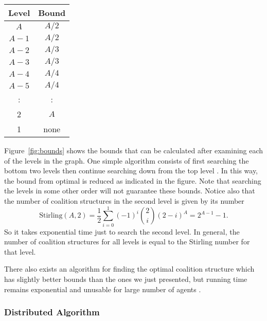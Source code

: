 \begin{SCfigure}
  \begin{minipage}{1.0\linewidth}
  \begin{center}
    \begin{tabular}{cc}\toprule
      Level&Bound \\ \midrule
      $A$  &$A/2$ \\ 
      $A-1$&$A/2$ \\ 
      $A-2$&$A/3$ \\ 
      $A-3$&$A/3$ \\ 
      $A-4$&$A/4$ \\ 
      $A-5$&$A/4$ \\ 
      :    &:  \\ 
      2    &$A$ \\ 
      1    &none  \\ \bottomrule
    \end{tabular} 
  \end{center}
  \end{minipage}
  \caption{Bounds on optimality after searching various levels.}
  \label{fig:bounds}
\end{SCfigure}

Figure~\ref{fig:bounds} shows the bounds that can be calculated after
examining each of the levels in the graph. One simple algorithm
consists of first searching the bottom two levels then continue
searching down from the top level \cite{sandholm99b}. In this way, the
bound from optimal is reduced as indicated in the figure.  Note that
searching the levels in some other order will not guarantee these
bounds. Notice also that the number of coalition structures in the
second level is given by its  number
\begin{equation}
  \label{eq:stirling}
\text{Stirling}(A,2) = \frac{1}{2} \sum_{i=0}^{1} (-1)^i
\binom{2}{i}(2-i)^A = 2^{A-1} - 1.  
\end{equation}
So it takes exponential time just to search the second level. In
general, the number of coalition structures for all levels is equal to
the Stirling number for that level.

There also exists an algorithm for finding the optimal coalition
structure which has slightly better bounds than the ones we just
presented, but running time remains exponential and unusable for large
number of agents \cite{dang04a}.


\subsubsection{Distributed Algorithm}

